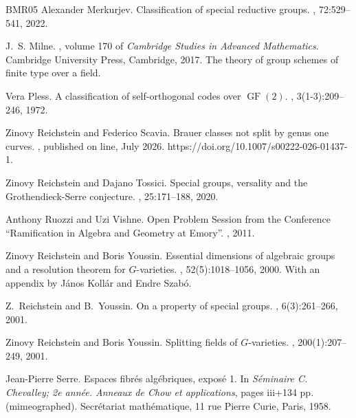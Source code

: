 \documentclass[12pt]{amsart}
\numberwithin{equation}{section}
\theoremstyle{remark}
\begin{document}
\begin{thebibliography}{BMR05}
Alexander Merkurjev.
\newblock Classification of special reductive groups.
, 72:529--541, 2022.

J.~S. Milne.
, volume 170 of {\em Cambridge Studies in Advanced Mathematics}.
\newblock Cambridge University Press, Cambridge, 2017.
\newblock The theory of group schemes of finite type over a field.

Vera Pless.
\newblock A classification of self-orthogonal codes over {$\operatorname{GF}(2)$}.
, 3(1-3):209--246, 1972.

Zinovy Reichstein and Federico Scavia.
\newblock Brauer classes not split by genus one curves.
, published on line, July 2026.
\newblock https://doi.org/10.1007/s00222-026-01437-1.

Zinovy Reichstein and Dajano Tossici.
\newblock Special groups, versality and the {G}rothendieck-{S}erre conjecture.
, 25:171--188, 2020.

Anthony Ruozzi and Uzi Vishne.
\newblock Open {P}roblem {S}ession from the {C}onference ``{R}amification in {A}lgebra and {G}eometry at {E}mory''.
, 2011.

Zinovy Reichstein and Boris Youssin.
\newblock Essential dimensions of algebraic groups and a resolution theorem for {$G$}-varieties.
, 52(5):1018--1056, 2000.
\newblock With an appendix by J\'anos Koll\'ar and Endre Szab\'o.

Z.~Reichstein and B.~Youssin.
\newblock On a property of special groups.
, 6(3):261--266, 2001.

Zinovy Reichstein and Boris Youssin.
\newblock Splitting fields of {$G$}-varieties.
, 200(1):207--249, 2001.

Jean-Pierre Serre.
\newblock Espaces fibr\'es alg\'ebriques, expos\'e 1.
\newblock In {\em S\'{e}minaire {C}. {C}hevalley; 2e ann\'{e}e. {A}nneaux de {C}how et applications}, pages iii+134 pp. (mimeographed). Secr\'{e}tariat math\'{e}matique, 11 rue Pierre Curie, Paris, 1958.


\end{thebibliography}
\end{document}

